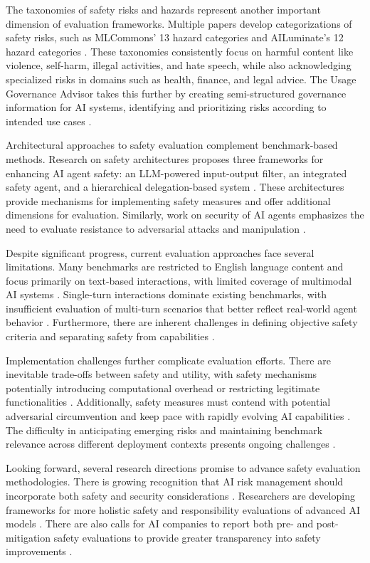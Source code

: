 \documentclass[conference]{IEEEtran}
\begin{document}
The taxonomies of safety risks and hazards represent another important dimension of evaluation frameworks. Multiple papers develop categorizations of safety risks, such as MLCommons' 13 hazard categories \cite{2404.12241} and AILuminate's 12 hazard categories \cite{2503.05731}. These taxonomies consistently focus on harmful content like violence, self-harm, illegal activities, and hate speech, while also acknowledging specialized risks in domains such as health, finance, and legal advice. The Usage Governance Advisor takes this further by creating semi-structured governance information for AI systems, identifying and prioritizing risks according to intended use cases \cite{2412.01957}.

Architectural approaches to safety evaluation complement benchmark-based methods. Research on safety architectures proposes three frameworks for enhancing AI agent safety: an LLM-powered input-output filter, an integrated safety agent, and a hierarchical delegation-based system \cite{2409.03793}. These architectures provide mechanisms for implementing safety measures and offer additional dimensions for evaluation. Similarly, work on security of AI agents emphasizes the need to evaluate resistance to adversarial attacks and manipulation \cite{2406.08689}.

Despite significant progress, current evaluation approaches face several limitations. Many benchmarks are restricted to English language content and focus primarily on text-based interactions, with limited coverage of multimodal AI systems \cite{2503.05731, 2404.12241}. Single-turn interactions dominate existing benchmarks, with insufficient evaluation of multi-turn scenarios that better reflect real-world agent behavior \cite{2412.14470}. Furthermore, there are inherent challenges in defining objective safety criteria and separating safety from capabilities \cite{2407.21792}.

Implementation challenges further complicate evaluation efforts. There are inevitable trade-offs between safety and utility, with safety mechanisms potentially introducing computational overhead or restricting legitimate functionalities \cite{2409.03793}. Additionally, safety measures must contend with potential adversarial circumvention and keep pace with rapidly evolving AI capabilities \cite{2406.08689}. The difficulty in anticipating emerging risks and maintaining benchmark relevance across different deployment contexts presents ongoing challenges \cite{2503.23424}.

Looking forward, several research directions promise to advance safety evaluation methodologies. There is growing recognition that AI risk management should incorporate both safety and security considerations \cite{2405.19524}. Researchers are developing frameworks for more holistic safety and responsibility evaluations of advanced AI models \cite{2404.14068}. There are also calls for AI companies to report both pre- and post-mitigation safety evaluations to provide greater transparency into safety improvements \cite{2503.17388}.
\end{document}
